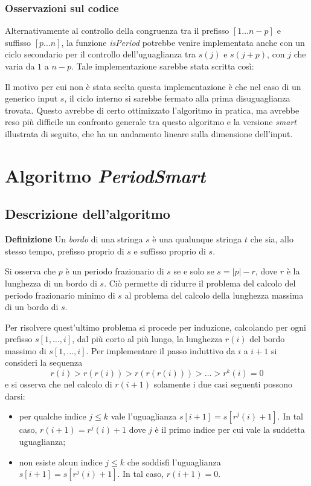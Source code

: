 \documentclass[11pt,a4paper,italian]{article}
\begin{document}
\subsubsection{Osservazioni sul codice}

Alternativamente al controllo della congruenza tra il prefisso $[1 \dots n-p]$ e suffisso $[p \dots n]$, la funzione \textit{isPeriod} potrebbe venire implementata anche con un ciclo secondario per il controllo dell'uguaglianza tra $s(j)$ e $s(j+p)$, con $j$ che varia da $1$ a $n-p$.
Tale implementazione sarebbe stata scritta così:
 

Il motivo per cui non è stata scelta questa implementazione è che nel caso di un generico input $s$, il ciclo interno si sarebbe fermato alla prima disuguaglianza trovata. Questo avrebbe di certo ottimizzato l'algoritmo in pratica, ma avrebbe reso più difficile un confronto generale tra questo algoritmo e la versione \textit{smart} illustrata di seguito, che ha un andamento lineare sulla dimensione dell'input.


\section{Algoritmo \textit{PeriodSmart}}

\subsection{Descrizione dell'algoritmo}
\textbf{Definizione} Un \textit{bordo} di una stringa $s$ è una qualunque stringa $t$ che sia, allo stesso tempo, prefisso proprio di $s$ e suffisso proprio di $s$.

Si osserva che $p$ è un periodo frazionario di $s$ se e solo se $s = |p|-r$, dove $r$ è la lunghezza di un bordo di $s$. Ciò permette di ridurre il problema del calcolo del periodo frazionario minimo di $s$ al problema del calcolo della lunghezza massima di un bordo di $s$.

Per risolvere quest'ultimo problema si procede per induzione, calcolando per ogni prefisso $s[1,\dots,i]$, dal più corto al più lungo, la lunghezza $r(i)$ del bordo massimo di $s[1,\dots,i]$.
Per implementare il passo induttivo da $i$ a $i+1$ si consideri la sequenza
\begin{equation*}
r(i)>r(r(i))>r(r(r(i)))>\dots>r^{k}(i)=0
\end{equation*}
e si osserva che nel calcolo di $r(i+1)$ solamente i due casi seguenti possono darsi:
\begin{itemize}
\item per qualche indice $j \leq k$ vale l'uguaglianza $s[i+1] = s[r^{j}(i)+1]$. In tal caso, $r(i+1) = r^{j}(i)+1$ dove $j$ è il primo indice per cui vale la suddetta uguaglianza;
\item non esiste alcun indice $j \leq k$ che soddisfi l'uguaglianza $s[i+1] = s[r^{j}(i)+1]$. In tal caso, $r(i+1) = 0$.
\end{itemize}
\end{document}
